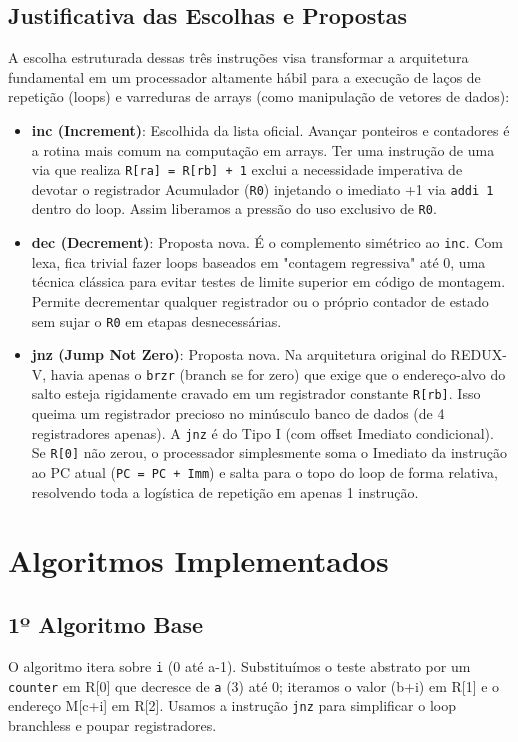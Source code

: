 \documentclass[11pt,a4paper]{article}
\begin{document}
\subsection*{Justificativa das Escolhas e Propostas}
A escolha estruturada dessas três instruções visa transformar a arquitetura fundamental em um processador altamente hábil para a execução de laços de repetição (loops) e varreduras de arrays (como manipulação de vetores de dados):
\begin{itemize}
    \item \textbf{inc (Increment)}: Escolhida da lista oficial. Avançar ponteiros e contadores é a rotina mais comum na computação em arrays. Ter uma instrução de uma via que realiza \texttt{R[ra] = R[rb] + 1} exclui a necessidade imperativa de devotar o registrador Acumulador (\texttt{R0}) injetando o imediato +1 via \texttt{addi 1} dentro do loop. Assim liberamos a pressão do uso exclusivo de \texttt{R0}.
    \item \textbf{dec (Decrement)}: Proposta nova. É o complemento simétrico ao \texttt{inc}. Com lexa, fica trivial fazer loops baseados em "contagem regressiva" até 0, uma técnica clássica para evitar testes de limite superior em código de montagem. Permite decrementar qualquer registrador ou o próprio contador de estado sem sujar o \texttt{R0} em etapas desnecessárias.
    \item \textbf{jnz (Jump Not Zero)}: Proposta nova. Na arquitetura original do REDUX-V, havia apenas o \texttt{brzr} (branch se for zero) que exige que o endereço-alvo do salto esteja rigidamente cravado em um registrador constante \texttt{R[rb]}. Isso queima um registrador precioso no minúsculo banco de dados (de 4 registradores apenas). A \texttt{jnz} é do Tipo I (com offset Imediato condicional). Se \texttt{R[0]} não zerou, o processador simplesmente soma o Imediato da instrução ao PC atual (\texttt{PC = PC + Imm}) e salta para o topo do loop de forma relativa, resolvendo toda a logística de repetição em apenas 1 instrução.
\end{itemize}

\newpage

\section{Algoritmos Implementados}

\subsection{1º Algoritmo Base}
O algoritmo itera sobre \texttt{i} (0 até a-1). Substituímos o teste abstrato por um \texttt{counter} em R[0] que decresce de \texttt{a} (3) até 0; iteramos o valor (b+i) em R[1] e o endereço M[c+i] em R[2]. Usamos a instrução \texttt{jnz} para simplificar o loop branchless e poupar registradores.
\end{document}
